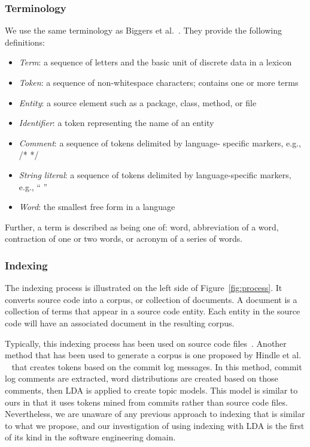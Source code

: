     \subsubsection{Terminology}
    We use the same terminology as Biggers et al.~\cite{Biggers-etal:2014}.
    They provide the following definitions:
    \begin{itemize}
    \setlength{\itemsep}{1pt}
    \setlength{\parskip}{0pt}
    \setlength{\parsep}{0pt}
    \item \textit{Term}: a sequence of letters and the basic unit of discrete data in a lexicon
    \item \textit{Token}: a sequence of non-whitespace characters; contains one or more terms
    \item \textit{Entity}: a source element such as a package, class, method, or file
    \item \textit{Identifier}: a token representing the name of an entity
    \item \textit{Comment}: a sequence of tokens delimited by language-
    specific markers, e.g., /* */
    \item \textit{String literal}: a sequence of tokens delimited by
    language-specific markers, e.g., “ ”
    \item \textit{Word}: the smallest free form in a language
    \end{itemize}
    Further, a term is described as being one of:
    word,
    abbreviation of a word,
    contraction of one or two words,
    or acronym of a series of words.

    \subsubsection{Indexing}
    The indexing process is illustrated on the left side of Figure~\ref{fig:process}.
    It converts source code into a corpus, or collection of documents.
    A document is a collection of terms that appear in a source code entity.
    Each entity in the source code will have an associated document in the resulting corpus.

    Typically, this indexing process has been used on source code files~\cite{Linstead-etal:2007b}\cite{Lukins-etal:2008}.
    Another method that has been used to generate a corpus is one proposed by Hindle et al. ~\cite{Hindle-etal:2009} that creates tokens based on the commit log messages.
    In this method,
    commit log comments are extracted,
    word distributions are created based on those comments,
    then LDA is applied to create topic models.
    This model is similar to ours in that it uses tokens mined from commits rather than source code files.
    Nevertheless, we are unaware of any previous approach to indexing that is similar to what we propose,
    and our investigation of using indexing with LDA is the first of its kind in the software engineering domain.


